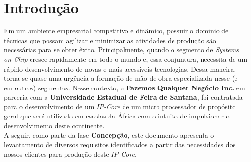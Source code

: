 \section{Introdução}

Em um ambiente empresarial competitivo e dinâmico, possuir o domínio de técnicas que possam agilizar e minimizar as atividades de produção são necessárias para se obter êxito. Principalmente, quando o segmento de \textit{Systems on Chip} cresce rapidamente em todo o mundo e, essa conjuntura, necessita de um rápido desenvolvimento de novas e mais acessíveis tecnologias. Dessa maneira, torna-se quase uma urgência a formação de mão de obra especializada nesse (e em outros) segmentos. Nesse contexto, a \textbf{Fazemos Qualquer Negócio Inc.} em parceria com a \textbf{Universidade Estadual de Feira de Santana}, foi contratada para o desenvolvimento de um \textit{IP-Core} de um micro processador de propósito geral que será utilizado em escolas da África com o intuito de impulsionar o desenvolvimento deste continente. \\
A seguir, como parte da fase \textbf{Concepção}, este documento apresenta o levantamento de diversos requisitos identificados a partir das necessidades dos nossos clientes para produção deste \textit{IP-Core}.